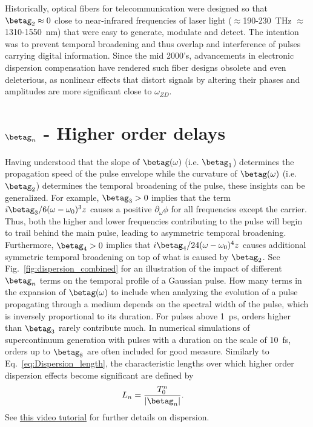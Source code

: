 Historically, optical fibers for telecommunication were designed so that $\betag_2\approx0$ close to near-infrared frequencies of laser light ($\approx$190-230~THz $\approx$1310-1550~nm) that were easy to generate, modulate and detect. The intention was to prevent temporal broadening and thus overlap and interference of pulses carrying digital information. Since the mid 2000's, advancements in electronic dispersion compensation have rendered such fiber designs obsolete and even deleterious, as nonlinear effects that distort signals by altering their phases and amplitudes are more significant close to $\omega_{ZD}$.


\section{$\betag_n$ - Higher order delays}
Having understood that the slope of $\betag(\omega)$ (i.e. $\betag_1$) determines the propagation speed of the pulse envelope while the curvature of $\betag(\omega)$ (i.e. $\betag_2$) determines the temporal broadening of the pulse, these insights can be generalized. For example, $\betag_3>0$ implies that the term $i\betag_3/6(\omega-\omega_0)^3z$ causes a positive $\partial_\omega\phi$ for all frequencies except the carrier. Thus, both the higher and lower frequencies contributing to the pulse will begin to trail behind the main pulse, leading to asymmetric temporal broadening. Furthermore, $\betag_4>0$ implies that $i\betag_4/24(\omega-\omega_0)^4z$ causes additional symmetric temporal broadening on top of what is caused by $\betag_2$. See Fig.~\ref{fig:dispersion_combined} for an illustration of the impact of different $\betag_n$ terms on the temporal profile of a Gaussian pulse. How many terms in the expansion of $\betag(\omega)$ to include when analyzing the evolution of a pulse propagating through a medium depends on the spectral width of the pulse, which is inversely proportional to its duration. For pulses above 1~ps, orders higher than $\betag_3$ rarely contribute much. In numerical simulations of supercontinuum generation with pulses with a duration on the scale of 10~fs, orders up to $\betag_8$ are often included for good measure. Similarly to Eq.~\ref{eq:Dispersion_length}, the characteristic lengths over which higher order dispersion effects become significant are defined by
\begin{align}
\label{eq:dispersion_length_general}
    L_{n} &= \frac{T_0^n}{|\betag_n|}.
\end{align}
See \href{https://www.youtube.com/watch?v=E3S0BQiy3p8&ab_channel=YourFavouriteTA}{this video tutorial} for further details on dispersion.

